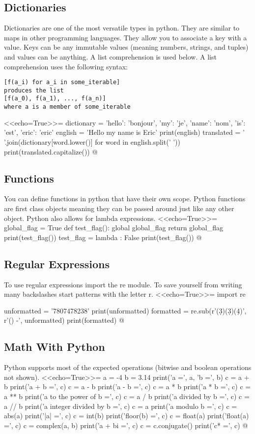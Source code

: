 \documentclass[12pt]{exam}
\begin{document}
\subsection{Dictionaries}
Dictionaries are one of the most versatile types in python. They are similar to maps in other programming languages.
They allow you to associate a key with a value. Keys can be any immutable values (meaning numbers, strings, and tuples)
and values can be anything. A list comprehension is used below. A list comprehension uses the following syntax:
\begin{verbatim}
[f(a_i) for a_i in some_iterable]
produces the list
[f(a_0), f(a_1), ..., f(a_n)]
where a is a member of some_iterable
\end{verbatim}
<<echo=True>>=
dictionary = {
    'hello': 'bonjour',
    'my': 'je',
    'name': 'nom',
    'is': 'est',
    'eric': 'eric'
}
english = 'Hello my name is Eric'
print(english)
translated = ' '.join(dictionary[word.lower()] for word in english.split(' '))
print(translated.capitalize())
@

\subsection{Functions}
You can define functions in python that have their own scope. Python functions are first class objects meaning they can
be passed around just like any other object. Python also allows for lambda expressions.
<<echo=True>>=
global_flag = True
def test_flag():
    global global_flag
    return global_flag
print(test_flag())
test_flag = lambda : False
print(test_flag())
@

\subsection{Regular Expressions}
To use regular expressions import the re module. To save yourself from writing many backslashes start patterns with the
letter r.
<<echo=True>>=
import re

unformatted = '7807478238'
print(unformatted)
formatted = re.sub(r'(\d{3})(\d{3})(\d{4})', r'(\1) \2-\3', unformatted)
print(formatted)
@

\subsection{Math With Python}
Python supports most of the expected operations (bitwise and boolean operations not shown).
<<echo=True>>=
a = -4
b = 3.14
print('a =', a, 'b =', b)
c = a + b
print('a + b =', c)
c = a - b
print('a - b =', c)
c = a * b
print('a * b =', c)
c = a ** b
print('a to the power of b =', c)
c = a / b
print('a divided by b =', c)
c = a // b
print('a integer divided by b =', c)
c = a %
print('a modulo b =', c)
c = abs(a)
print('|a| =', c)
c = int(b)
print('floor(b) =', c)
c = float(a)
print('float(a) =', c)
c = complex(a, b)
print('a + bi =', c)
c = c.conjugate()
print('c* =', c)
@
\end{document}
